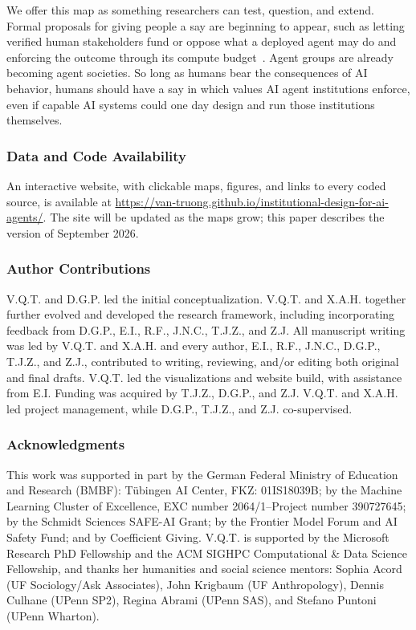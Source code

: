 \documentclass[runningheads]{llncs}
\begin{document}
We offer this map as something researchers can test, question, and extend. Formal proposals for giving people a say are beginning to appear, such as letting verified human stakeholders fund or oppose what a deployed agent may do and enforcing the outcome through its compute budget~\mbox{\citep{chandra2026resourced}}. Agent groups are already becoming agent societies. So long as humans bear the consequences of AI behavior, humans should have a say in which values AI agent institutions enforce, even if capable AI systems could one day design and run those institutions themselves.

\subsubsection*{Data and Code Availability}
An interactive website, with clickable maps, figures, and links to every coded source, is available at \url{https://van-truong.github.io/institutional-design-for-ai-agents/}. The site will be updated as the maps grow; this paper describes the version of September 2026.

\subsubsection*{Author Contributions}\label{sec:contributions}
V.Q.T. and D.G.P. led the initial conceptualization. V.Q.T. and X.A.H. together further evolved and developed the research framework, including incorporating feedback from D.G.P., E.I., R.F., J.N.C., T.J.Z., and Z.J. All manuscript writing was led by V.Q.T. and X.A.H. and every author, E.I., R.F., J.N.C., D.G.P., T.J.Z., and Z.J., contributed to writing, reviewing, and/or editing both original and final drafts. V.Q.T. led the visualizations and website build, with assistance from E.I. Funding was acquired by T.J.Z., D.G.P., and Z.J. V.Q.T. and X.A.H. led project management, while D.G.P., T.J.Z., and Z.J. co-supervised.

\subsubsection*{Acknowledgments}

This work was supported in part by the German Federal Ministry of Education and Research (BMBF): Tübingen AI Center, FKZ: 01IS18039B; by the Machine Learning Cluster of Excellence, EXC number 2064/1--Project number 390727645; by the Schmidt Sciences SAFE-AI Grant; by the Frontier Model Forum and AI Safety Fund; and by Coefficient Giving. V.Q.T. is supported by the Microsoft Research PhD Fellowship and the ACM SIGHPC Computational \& Data Science Fellowship, and thanks her humanities and social science mentors: Sophia Acord (UF Sociology/Ask Associates), John Krigbaum (UF Anthropology), Dennis Culhane (UPenn SP2), Regina Abrami (UPenn SAS), and Stefano Puntoni (UPenn Wharton).
\end{document}
